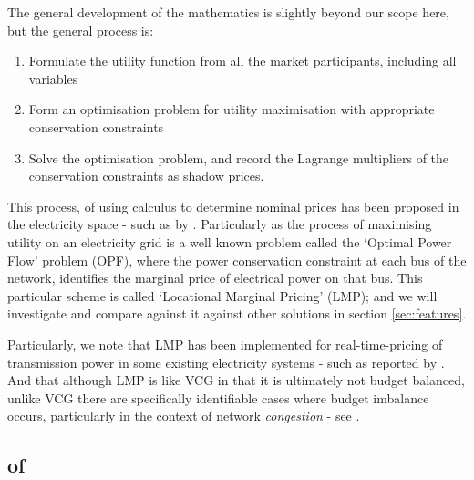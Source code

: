 The general development of the mathematics is slightly beyond our scope here, but the general process is:
\begin{enumerate}
\item Formulate the utility function from all the market participants, including all variables
\item Form an optimisation problem for utility maximisation with appropriate conservation constraints
\item Solve the optimisation problem, and record the Lagrange multipliers of the conservation constraints as shadow prices.
\end{enumerate}
This process, of using calculus to determine nominal prices has been proposed in the electricity space \DIFdelbegin {}\DIFdelend - such as by \cite{lmp1, lmp2, lmp4, game3}.
Particularly as the process of maximising utility on an electricity grid is a well known problem called the `Optimal Power Flow' problem (OPF), where the power conservation constraint at each bus of the network, identifies the marginal price of electrical power on that bus.
This particular scheme is called `Locational Marginal Pricing' (LMP); and we will investigate and compare against it against other solutions in section \ref{sec:features}.

Particularly, we note that LMP has been implemented for real-time-pricing of transmission power in some existing electricity systems - such as reported by \cite{WANG2015695,zonal}.
And that although LMP is like VCG in that it is ultimately not budget balanced, unlike VCG there are specifically identifiable cases where budget imbalance occurs, particularly in the context of network \textit{congestion} - see \cite{lmp2}.




\subsection{\DIFdelbegin {}\DIFdelend \DIFaddbegin {}\DIFaddend of \DIFdelbegin {}\DIFdelend \DIFaddbegin {}\DIFaddend }

\DIFaddbegin {}

